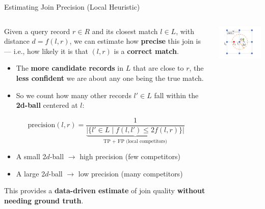 \documentclass[8pt]{beamer} %
\begin{document}
\begin{frame}{Estimating Join Precision (Local Heuristic)}
	
	\small
	\begin{columns}
		\begin{column}{0.4\textwidth}
			Given a query record $r \in R$ and its closest match $l \in L$, with distance $d = f(l, r)$, we can estimate how \textbf{precise} this join is — i.e., how likely it is that $(l, r)$ is a \textbf{correct match}.
			

			\begin{itemize}
				\item The \textbf{more candidate records} in $L$ that are close to $r$, the \textbf{less confident} we are about any one being the true match.
				\item So we count how many other records $l' \in L$ fall within the \textbf{2d-ball} centered at $l$:
			\end{itemize}
			
			\[
			\text{precision}(l, r) =
			\frac{1}{
				\underbrace{|\{ l' \in L \mid f(l, l') \leq 2f(l, r) \}|}_{\text{TP + FP (local competitors)}}
			}
			\]
			
			\begin{itemize}
				\item A small 2$d$-ball $\rightarrow$ high precision (few competitors)
				\item A large 2$d$-ball $\rightarrow$ low precision (many competitors)
			\end{itemize}
			

			This provides a \textbf{data-driven estimate} of join quality \textbf{without needing ground truth}.
		\end{column}
		
		\begin{column}{0.4\textwidth}
			\centering
			\includegraphics[width=0.7\linewidth]{img/Pasted image 20250331211545.png}
			


\end{column}
\end{columns}
\end{frame}
\end{document}
